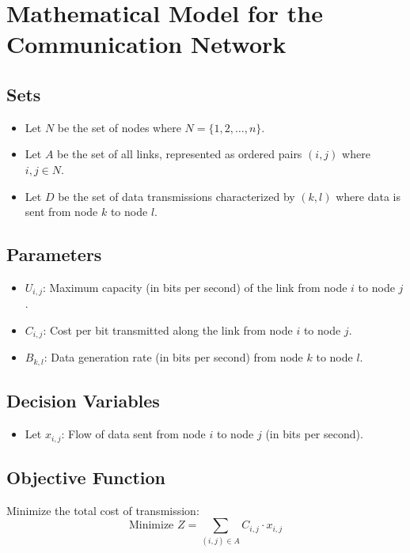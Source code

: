 \documentclass{article}
\begin{document}
\section*{Mathematical Model for the Communication Network}

\subsection*{Sets}
\begin{itemize}
    \item Let \( N \) be the set of nodes where \( N = \{1, 2, \ldots, n\} \).
    \item Let \( A \) be the set of all links, represented as ordered pairs \( (i, j) \) where \( i, j \in N \).
    \item Let \( D \) be the set of data transmissions characterized by \( (k, l) \) where data is sent from node \( k \) to node \( l \).
\end{itemize}

\subsection*{Parameters}
\begin{itemize}
    \item \( U_{i,j} \): Maximum capacity (in bits per second) of the link from node \( i \) to node \( j \).
    \item \( C_{i,j} \): Cost per bit transmitted along the link from node \( i \) to node \( j \).
    \item \( B_{k,l} \): Data generation rate (in bits per second) from node \( k \) to node \( l \).
\end{itemize}

\subsection*{Decision Variables}
\begin{itemize}
    \item Let \( x_{i,j} \): Flow of data sent from node \( i \) to node \( j \) (in bits per second).
\end{itemize}

\subsection*{Objective Function}
Minimize the total cost of transmission:
\[
\text{Minimize } Z = \sum_{(i,j) \in A} C_{i,j} \cdot x_{i,j}
\]
\end{document}
